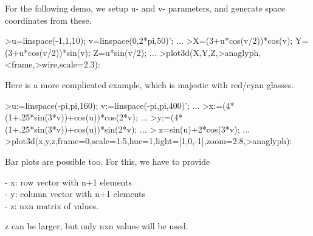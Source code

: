 \documentclass[a4paper,10pt]{article}
\begin{document}
\begin{eulernotebook}
\begin{eulercomment}
For the following demo, we setup u- and v- parameters, and generate space coordinates
from these.
\end{eulercomment}
\begin{eulerprompt}
>u=linspace(-1,1,10); v=linspace(0,2*pi,50)'; ...
>X=(3+u*cos(v/2))*cos(v); Y=(3+u*cos(v/2))*sin(v); Z=u*sin(v/2); ...
>plot3d(X,Y,Z,>anaglyph,<frame,>wire,scale=2.3):
\end{eulerprompt}
\begin{eulercomment}
Here is a more complicated example, which is majestic with red/cyan glasses.
\end{eulercomment}
\begin{eulerprompt}
>u:=linspace(-pi,pi,160); v:=linspace(-pi,pi,400)';  ...
>x:=(4*(1+.25*sin(3*v))+cos(u))*cos(2*v); ...
>y:=(4*(1+.25*sin(3*v))+cos(u))*sin(2*v); ...
> z=sin(u)+2*cos(3*v); ...
>plot3d(x,y,z,frame=0,scale=1.5,hue=1,light=[1,0,-1],zoom=2.8,>anaglyph):
\end{eulerprompt}
\begin{eulercomment}
Bar plots are possible too. For this, we have to provide

- x: row vector with n+1 elements\\
- y: column vector with n+1 elements\\
- z: nxn matrix of values.

z can be larger, but only nxn values will be used.


\end{eulercomment}
\end{eulernotebook}
\end{document}
